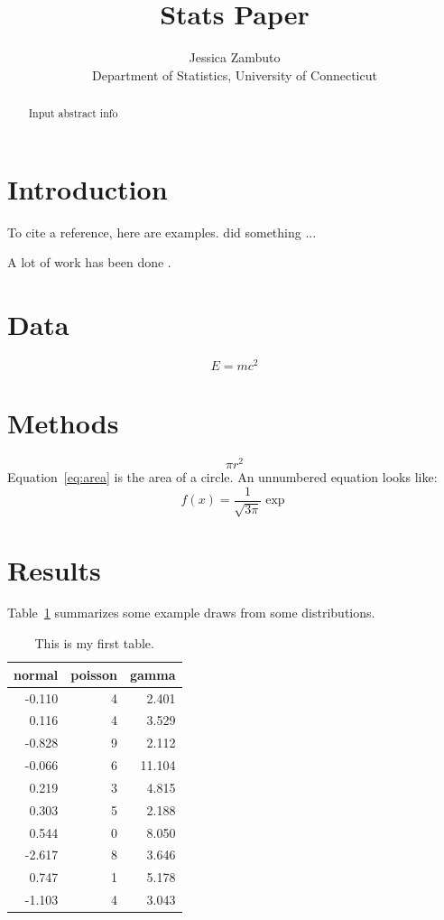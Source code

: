 \documentclass[12pt]{article}
\title{Stats Paper}
\author{Jessica Zambuto\\
Department of Statistics, University of Connecticut}
\begin{document}
\maketitle

\begin{abstract}
Input abstract info 	
\end{abstract}

\section{Introduction}
\label{sec:intro}

\lipsum[1-3]
To cite a reference, here are examples.
\citet{xie2015dynamic} did something ... \lipsum[1]

A lot of work has been done \citep[e.g.,][]{xie2015dynamic}.
\lipsum[2]

\section{Data}
\label{sec:data}
\begin{equation}
  \label{eq:mc2}
  E= m c^2
\end{equation}


\section{Methods}
\label{sec:meth}
\begin{equation}
	\label{eq:area}
	\pi r^2
\end{equation}
Equation~\eqref{eq:area} is the area of a circle.
An unnumbered equation looks like:
\[
f(x)=\frac{1}{\sqrt{3\pi}}\exp
\]

\section{Results}
\label{sec:results}
Table~\ref{tab:rv} summarizes some example draws from some distributions.
\lipsum[1-4]

\begin{table}[ht]
  \caption{This is my first table.}
  \label{tab:rv}
\centering
\begin{tabular}{rrr}
  \toprule
normal & poisson & gamma \\ 
  \midrule
-0.110 & 4 & 2.401 \\ 
  0.116 & 4 & 3.529 \\ 
  -0.828 & 9 & 2.112 \\ 
  -0.066 & 6 & 11.104 \\ 
  0.219 & 3 & 4.815 \\ 
  0.303 & 5 & 2.188 \\ 
  0.544 & 0 & 8.050 \\ 
  -2.617 & 8 & 3.646 \\ 
  0.747 & 1 & 5.178 \\ 
  -1.103 & 4 & 3.043 \\ 
   \bottomrule
\end{tabular}
\end{table}
\end{document}
